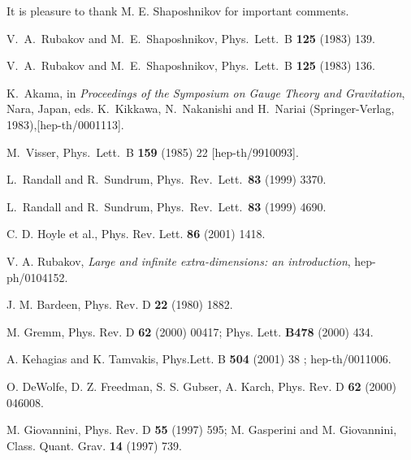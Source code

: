 \documentclass[a4paper,12pt]{article}
\begin{document}
It is pleasure to thank M. E. Shaposhnikov for important comments.
\begin{thebibliography}{99}
V.~A.~Rubakov and M.~E.~Shaposhnikov,
Phys.\ Lett.\ B {\bf 125} (1983) 139.

V.~A.~Rubakov and M.~E.~Shaposhnikov,
Phys.\ Lett.\  B {\bf 125} (1983) 136.

K.~Akama, in {\it Proceedings of the Symposium on Gauge 
Theory and Gravitation}, 
Nara, Japan, eds. K.~Kikkawa, N.~Nakanishi and H.~Nariai (Springer-Verlag, 
1983),[hep-th/0001113].

M.~Visser,
Phys.\ Lett.\  B {\bf 159} (1985) 22
[hep-th/9910093].

 L.~Randall and R.~Sundrum,
Phys.\ Rev.\ Lett.\  {\bf 83} (1999) 3370.

L.~Randall and R.~Sundrum,
Phys.\ Rev.\ Lett.\  {\bf 83} (1999) 4690.

  C. D. Hoyle et al., Phys. Rev. Lett. {\bf 86} (2001) 1418.

 V. A. Rubakov, {\em Large and infinite extra-dimensions: 
an introduction}, hep-ph/0104152.

 J. M. Bardeen, Phys. Rev. D {\bf 22} (1980) 1882.

 M. Gremm,  Phys. Rev. D {\bf 62} (2000) 00417;
Phys. Lett. {\bf B478}  (2000) 434.

 A. Kehagias and K. Tamvakis, Phys.Lett. B {\bf 504} (2001) 38
; hep-th/0011006.

 O. DeWolfe, D. Z. Freedman, S. S. Gubser, A. Karch, Phys. 
Rev. D {\bf 62} (2000) 046008.

 M. Giovannini, Phys. Rev. D {\bf 55} (1997) 595; 
M. Gasperini and M. Giovannini, Class. Quant. Grav. {\bf 14} (1997) 739.

\end{thebibliography}
\end{document}
